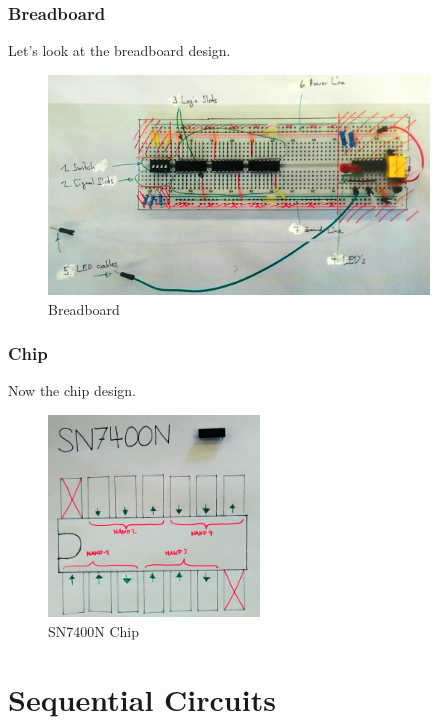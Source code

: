 \documentclass{beamer}
\begin{document}
\begin{frame}  \frametitle{Breadboard}
Let's look at the breadboard design.
    \begin{figure}[H]
      \centering
      \includegraphics[width=0.9\textwidth]{breadboard_labeled}%
      \caption{Breadboard}%
      \label{fig:breadboard_labelled}
    \end{figure}
\end{frame}

\begin{frame}  \frametitle{Chip}
Now the chip design.
    \begin{figure}[H]
      \centering
      \includegraphics[width=0.5\textwidth]{sn7400n}%
      \caption{SN7400N Chip}%
      \label{fig:sn7400n}
    \end{figure}
\end{frame}


\section{Sequential Circuits}
\end{document}
